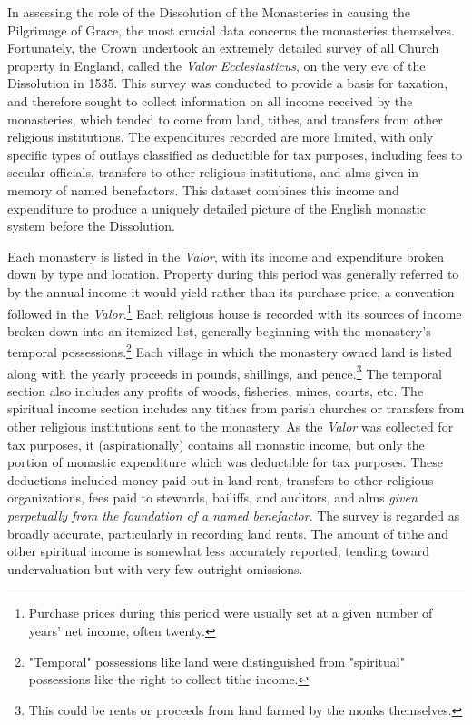 \documentclass[12pt]{article}
\begin{document}
In assessing the role of the Dissolution of the Monasteries in causing the Pilgrimage of Grace, the most crucial data concerns the monasteries themselves. Fortunately, the Crown undertook an extremely detailed survey of all Church property in England, called the \emph{Valor Ecclesiasticus}, on the very eve of the Dissolution in 1535. This survey was conducted to provide a basis for taxation, and therefore sought to collect information on all income received by the monasteries, which tended to come from land, tithes, and transfers from other religious institutions. The expenditures recorded are more limited, with only specific types of outlays classified as deductible for tax purposes, including fees to secular officials, transfers to other religious institutions, and alms given in memory of named benefactors. This dataset combines this income and expenditure to produce a uniquely detailed picture of the English monastic system before the Dissolution.

Each monastery is listed in the \emph{Valor}, with its income and expenditure broken down by type and location. Property during this period was generally referred to by the annual income it would yield rather than its purchase price, a convention followed in the \emph{Valor}.\footnote{Purchase prices during this period were usually set at a given number of years' net income, often twenty.} Each religious house is recorded with its sources of income broken down into an itemized list, generally beginning with the monastery's temporal possessions.\footnote{"Temporal" possessions like land were distinguished from "spiritual" possessions like the right to collect tithe income.} Each village in which the monastery owned land is listed along with the yearly proceeds in pounds, shillings, and pence.\footnote{This could be rents or proceeds from land farmed by the monks themselves.} The temporal section also includes any profits of woods, fisheries, mines, courts, etc. The spiritual income section includes any tithes from parish churches or transfers from other religious institutions sent to the monastery. As the \emph{Valor} was collected for tax purposes, it (aspirationally) contains all monastic income, but only the portion of monastic expenditure which was deductible for tax purposes. These deductions included money paid out in land rent, transfers to other religious organizations, fees paid to stewards, bailiffs, and auditors, and alms \emph{given perpetually from the foundation of a named benefactor}.\autocite[23-4]{ValorIntro} The survey is regarded as broadly accurate, particularly in recording land rents.\autocite[38]{Savine1909} The amount of tithe and other spiritual income is somewhat less accurately reported, tending toward undervaluation but with very few outright omissions.\autocite[48]{Savine1909} 
\end{document}
